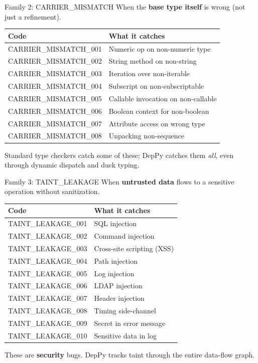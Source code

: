 \documentclass[aspectratio=169,10pt]{beamer}
\begin{document}
\begin{frame}{Family 2: CARRIER\_MISMATCH}
When the \textbf{base type itself} is wrong (not just a refinement).
\vspace{0.3em}
{\scriptsize
\begin{tabular}{@{}ll@{}}
\textbf{Code} & \textbf{What it catches} \\
\hline
CARRIER\_MISMATCH\_001 & Numeric op on non-numeric type \\
CARRIER\_MISMATCH\_002 & String method on non-string \\
CARRIER\_MISMATCH\_003 & Iteration over non-iterable \\
CARRIER\_MISMATCH\_004 & Subscript on non-subscriptable \\
CARRIER\_MISMATCH\_005 & Callable invocation on non-callable \\
CARRIER\_MISMATCH\_006 & Boolean context for non-boolean \\
CARRIER\_MISMATCH\_007 & Attribute access on wrong type \\
CARRIER\_MISMATCH\_008 & Unpacking non-sequence \\
\end{tabular}}
\vspace{0.3em}
Standard type checkers catch some of these; DepPy catches them \emph{all}, even through dynamic dispatch and duck typing.
\end{frame}

\begin{frame}{Family 3: TAINT\_LEAKAGE}
When \textbf{untrusted data} flows to a sensitive operation without sanitization.
\vspace{0.3em}
{\scriptsize
\begin{tabular}{@{}ll@{}}
\textbf{Code} & \textbf{What it catches} \\
\hline
TAINT\_LEAKAGE\_001 & SQL injection \\
TAINT\_LEAKAGE\_002 & Command injection \\
TAINT\_LEAKAGE\_003 & Cross-site scripting (XSS) \\
TAINT\_LEAKAGE\_004 & Path injection \\
TAINT\_LEAKAGE\_005 & Log injection \\
TAINT\_LEAKAGE\_006 & LDAP injection \\
TAINT\_LEAKAGE\_007 & Header injection \\
TAINT\_LEAKAGE\_008 & Timing side-channel \\
TAINT\_LEAKAGE\_009 & Secret in error message \\
TAINT\_LEAKAGE\_010 & Sensitive data in log \\
\end{tabular}}
\vspace{0.3em}
These are \textbf{security} bugs. DepPy tracks taint through the entire data-flow graph.
\end{frame}
\end{document}
